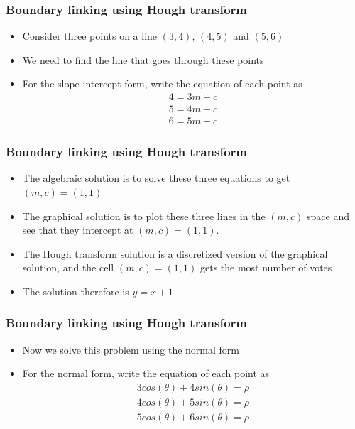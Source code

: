 \begin{frame}
\frametitle{Boundary linking using Hough transform}
\logoCSIPCPL\mypagenum
	\begin{itemize}
		\item Consider three points on a line $(3,4)$, $(4,5)$ and $(5,6)$
		\item We need to find the line that goes through these points
		\item For the slope-intercept form, write the equation of each point as
			\begin{align*}
				4=3m+c \\
				5=4m+c \\
				6=5m+c
			\end{align*}
		\end{itemize}
\end{frame}






\begin{frame}
\frametitle{Boundary linking using Hough transform}
\logoCSIPCPL\mypagenum
	\begin{itemize}
		\item The algebraic solution is to solve these three equations to get $(m,c)=(1,1)$
		\item The graphical solution is to plot these three lines in the $(m,c)$ space and see that they intercept at $(m,c)=(1,1)$.
		\item The Hough transform solution is a discretized version of the graphical solution, and the cell $(m,c)=(1,1)$ gets the most number of votes
		\item The solution therefore is $y=x+1$
	\end{itemize}
\end{frame}





\begin{frame}
\frametitle{Boundary linking using Hough transform}
\logoCSIPCPL\mypagenum
	\begin{itemize}
		\item Now we solve this problem using the normal form
		\item For the normal form, write the equation of each point as
		\begin{align*}
			3cos(\theta)+4sin(\theta)=\rho \\
			4cos(\theta)+5sin(\theta)=\rho \\
			5cos(\theta)+6sin(\theta)=\rho
		\end{align*}
	\end{itemize}
\end{frame}







